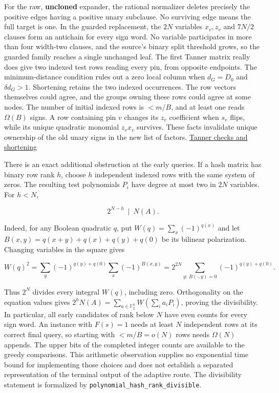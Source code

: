 \documentclass[
  11pt,
]{article}
\begin{document}
For the raw, \textbf{uncloned} expander, the rational normalizer deletes
precisely the positive edges having a positive unary subclause. No
surviving edge means the full target is one. In the guarded replacement,
the \(2N\) variables \(x_v,z_v\) and \(7N/2\) clauses form an antichain
for every sign word. No variable participates in more than four
width-two clauses, and the source's binary split threshold grows, so the
guarded family reaches a single unchanged leaf. The first Tanner matrix
really does give two indexed test rows reading every pin, from opposite
endpoints. The minimum-distance condition rules out a zero local column
when \(d_G=D_0\) and \(\delta d_G>1\). Shortening retains the two
indexed occurrences. The row vectors themselves could agree, and the
groups owning these rows could agree at some nodes. The number of
initial indexed rows is \(<m/B\), and at least one reads \(\Omega(B)\)
signs. A row containing pin \(v\) changes its \(z_v\) coefficient when
\(s_v\) flips, while its unique quadratic monomial \(z_vx_v\) survives.
These facts invalidate unique ownership of the old unary signs in the
new list of factors.
\href{https://github.com/openai/math/blob/main/preprints/The-Exponential-Time-Hypothesis-is-False-October-25-2026/build/main_full_version.tex\#L3363-L3436}{Tanner
checks and shortening}

There is an exact additional obstruction at the early queries. If a hash
matrix has binary row rank \(h\), choose \(h\) independent indexed rows
with the same system of zeros. The resulting test polynomials \(P_i\)
have degree at most two in \(2N\) variables. For \(h<N\),

\[
                 2^{N-h}\ \mid\ N(A).
\]

Indeed, for any Boolean quadratic \(q\), put \(W(q)=\sum_x(-1)^{q(x)}\)
and let \(B(x,y)=q(x+y)+q(x)+q(y)+q(0)\) be its bilinear polarization.
Changing variables in the square gives

\[
 W(q)^2
 =\sum_y(-1)^{q(y)+q(0)}\sum_x(-1)^{B(x,y)}
 =2^{2N}\sum_{y:\,B(\cdot,y)=0}(-1)^{q(y)+q(0)}.
\]

Thus \(2^N\) divides every integral \(W(q)\), including zero.
Orthogonality on the equation values gives
\(2^h N(A)=\sum_{a\in\mathbb F_2^h}W(\sum_i a_iP_i)\), proving the
divisibility. In particular, all early candidates of rank below \(N\)
have even counts for every sign word. An instance with \(F(s)=1\) needs
at least \(N\) independent rows at its correct final query, so starting
with \(<m/B=o(N)\) rows needs \(\Omega(N)\) appends. The upper bits of
the completed integer counts are available to the greedy comparisons.
This arithmetic observation supplies no exponential time bound for
implementing those choices and does not establish a separated
representation of the terminal output of the adaptive route. The divisibility statement is formalized by \nolinkurl{polynomial_hash_rank_divisible}.
\end{document}

